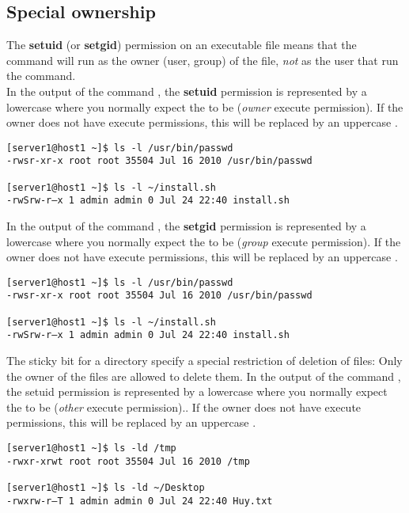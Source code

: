 \subsection{Special ownership}

The \textbf{setuid} (or \textbf{setgid}) permission on an executable file means that the command will run as the owner (user, group) of the file, \emph{not} as the user that run the command. \\

In the output of the command , the \textbf{setuid} permission is represented by a lowercase  where you normally expect the  to be (\emph{owner} execute permission). If the owner does not have execute permissions, this will be replaced by an uppercase .

\begin{verbatim}
[server1@host1 ~]$ ls -l /usr/bin/passwd
-rwsr-xr-x root root 35504 Jul 16 2010 /usr/bin/passwd

[server1@host1 ~]$ ls -l ~/install.sh
-rwSrw-r–x 1 admin admin 0 Jul 24 22:40 install.sh
\end{verbatim}

In the output of the command , the \textbf{setgid} permission is represented by a lowercase  where you normally expect the  to be (\emph{group} execute permission). If the owner does not have execute permissions, this will be replaced by an uppercase .

\begin{verbatim}
[server1@host1 ~]$ ls -l /usr/bin/passwd
-rwsr-xr-x root root 35504 Jul 16 2010 /usr/bin/passwd

[server1@host1 ~]$ ls -l ~/install.sh
-rwSrw-r–x 1 admin admin 0 Jul 24 22:40 install.sh
\end{verbatim}

The sticky bit for a directory specify a special restriction of deletion of files: Only the owner of the files are allowed to delete them.  In the output of the command , the setuid permission is represented by a lowercase  where you normally expect the  to be (\emph{other} execute permission).. If the owner does not have execute permissions, this will be replaced by an uppercase .


\begin{verbatim}
[server1@host1 ~]$ ls -ld /tmp
-rwxr-xrwt root root 35504 Jul 16 2010 /tmp

[server1@host1 ~]$ ls -ld ~/Desktop
-rwxrw-r–T 1 admin admin 0 Jul 24 22:40 Huy.txt
\end{verbatim}

